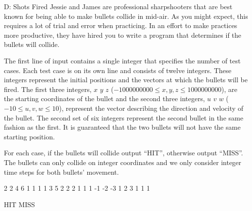 \begin{problem}{D: Shots Fired}
Jessie and James are professional sharpshooters that are best known for being able to make bullets collide in mid-air.
As you might expect, this requires a lot of trial and error when practicing.
In an effort to make practices more productive, they have hired you to write a program that determines if the bullets will collide.
\end{problem}

\begin{formalin}
The first line of input contains a single integer that specifies the number of test cases.
Each test case is on its own line and consists of twelve integers.
These integers represent the initial positions and the vectors at which the bullets will be fired.
The first three integers, $x$ $y$ $z$ ($-1000000000 \leq x, y, z \leq 1000000000$), are the starting coordinates of the bullet and the second three integers, $u$ $v$ $w$ ($-10 \leq u, v, w \leq 10$), represent the vector describing the direction and velocity of the bullet.
The second set of six integers represent the second bullet in the same fashion as the first.
It is guaranteed that the two bullets will not have the same starting position.
\end{formalin}

\begin{formalout}
For each case, if the bullets will collide output ``HIT'', otherwise output ``MISS''.
The bullets can only collide on integer coordinates and we only consider integer time steps for both bullets' movement. 
\end{formalout}

\begin{datain}
2
2 4 6 1 1 1 1 3 5 2 2 2
1 1 1 -1 -2 -3 1 2 3 1 1 1
\end{datain}

\begin{dataout}
HIT
MISS
\end{dataout}

